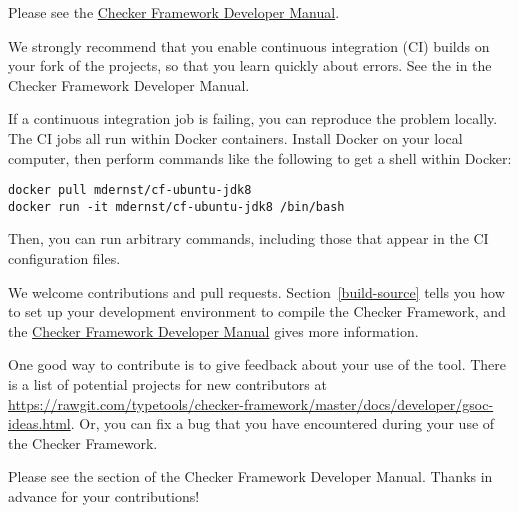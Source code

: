 
Please see the
\href{https://rawgit.com/typetools/checker-framework/master/docs/developer/developer-manual.html}{Checker Framework Developer Manual}.



We strongly recommend that you enable continuous integration (CI) builds on
your fork of the projects, so that you learn quickly about errors.  See the
 in the Checker Framework Developer Manual.



If a continuous integration job is failing, you can reproduce the problem locally.
The CI jobs all run within Docker containers.
Install Docker on your local computer, then perform commands like the
following to get a shell within Docker:

\begin{Verbatim}
docker pull mdernst/cf-ubuntu-jdk8
docker run -it mdernst/cf-ubuntu-jdk8 /bin/bash
\end{Verbatim}

Then, you can run arbitrary commands, including those that appear in the
CI configuration files.



We welcome contributions and pull requests.  Section~\ref{build-source}
tells you how to set up your development environment to compile the Checker
Framework, and the
\href{https://rawgit.com/typetools/checker-framework/master/docs/developer/developer-manual.html}{Checker
  Framework Developer Manual} gives more information.

One good way to contribute is to give feedback about your use of the tool.
There is a list
  of potential projects for new contributors at \url{https://rawgit.com/typetools/checker-framework/master/docs/developer/gsoc-ideas.html}.
Or, you can fix a bug that
you have encountered during your use of the Checker Framework.



Please see the
 section of the Checker Framework Developer Manual.
Thanks in advance for your contributions!

